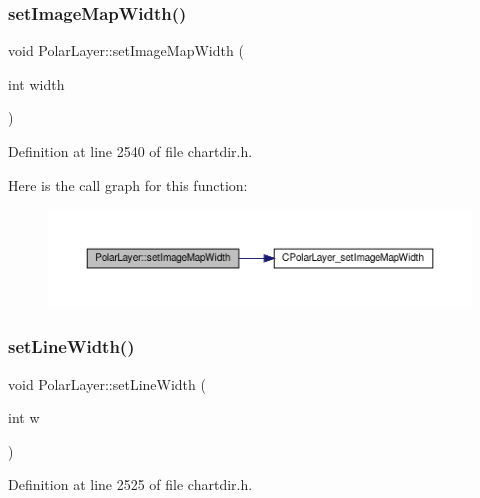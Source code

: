 \subsubsection{\texorpdfstring{set\+Image\+Map\+Width()}{setImageMapWidth()}}
{\footnotesize\ttfamily void Polar\+Layer\+::set\+Image\+Map\+Width (\begin{DoxyParamCaption}\item[{int}]{width }\end{DoxyParamCaption})\hspace{0.3cm}{\ttfamily [inline]}}



Definition at line 2540 of file chartdir.\+h.

Here is the call graph for this function\+:
\nopagebreak
\begin{figure}[H]
\begin{center}
\leavevmode
\includegraphics[width=350pt]{class_polar_layer_a4a43a7e514a5ef17aae900b41a61c1af_cgraph}
\end{center}
\end{figure}
\mbox{\label{class_polar_layer_abfffe32ae3290e562fa3642f8af14ca6}} 
\subsubsection{\texorpdfstring{set\+Line\+Width()}{setLineWidth()}}
{\footnotesize\ttfamily void Polar\+Layer\+::set\+Line\+Width (\begin{DoxyParamCaption}\item[{int}]{w }\end{DoxyParamCaption})\hspace{0.3cm}{\ttfamily [inline]}}



Definition at line 2525 of file chartdir.\+h.

